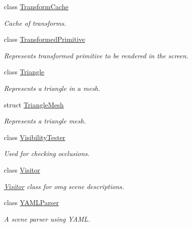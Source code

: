 \begin{DoxyCompactItemize}
class \mbox{\hyperlink{classomg_1_1_transform_cache}{Transform\+Cache}}
\begin{DoxyCompactList}\small\item\em Cache of transforms. \end{DoxyCompactList}\item 
class \mbox{\hyperlink{classomg_1_1_transformed_primitive}{Transformed\+Primitive}}
\begin{DoxyCompactList}\small\item\em Represents transformed primitive to be rendered in the screen. \end{DoxyCompactList}\item 
class \mbox{\hyperlink{classomg_1_1_triangle}{Triangle}}
\begin{DoxyCompactList}\small\item\em Represents a triangle in a mesh. \end{DoxyCompactList}\item 
struct \mbox{\hyperlink{structomg_1_1_triangle_mesh}{Triangle\+Mesh}}
\begin{DoxyCompactList}\small\item\em Represents a triangle mesh. \end{DoxyCompactList}\item 
class \mbox{\hyperlink{classomg_1_1_visibility_tester}{Visibility\+Tester}}
\begin{DoxyCompactList}\small\item\em Used for checking occlusions. \end{DoxyCompactList}\item 
class \mbox{\hyperlink{classomg_1_1_visitor}{Visitor}}
\begin{DoxyCompactList}\small\item\em \mbox{\hyperlink{classomg_1_1_visitor}{Visitor}} class for omg scene descriptions. \end{DoxyCompactList}\item 
class \mbox{\hyperlink{classomg_1_1_y_a_m_l_parser}{Y\+A\+M\+L\+Parser}}
\begin{DoxyCompactList}\small\item\em A scene parser using Y\+A\+ML. \end{DoxyCompactList}\end{DoxyCompactItemize}
